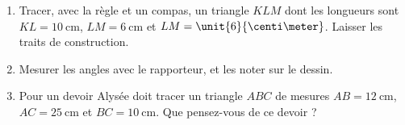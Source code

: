 
\begin{exercice}\label{exosmath-0823}

    \begin{enumerate}
        \item
            Tracer, avec la règle et un compas, un triangle \( KLM\) dont les longueurs sont \( KL=\SI{10}{\centi\meter}\), \( LM=\SI{6}{\centi\meter}\) et \( LM=\unit{6}{\centi\meter}\). Laisser les traits de construction.
        \item
            Mesurer les angles avec le rapporteur, et les noter sur le dessin.
        \item
            Pour un devoir Alysée doit tracer un triangle \( ABC\) de mesures \( AB=\SI{12}{\centi\meter}\), \( AC=\SI{25}{\centi\meter}\) et \( BC=\SI{10}{\centi\meter}\). Que pensez-vous de ce devoir ?
    \end{enumerate}

\end{exercice}
